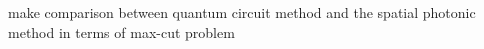 
make comparison between quantum circuit method and the spatial photonic method
in terms of max-cut problem